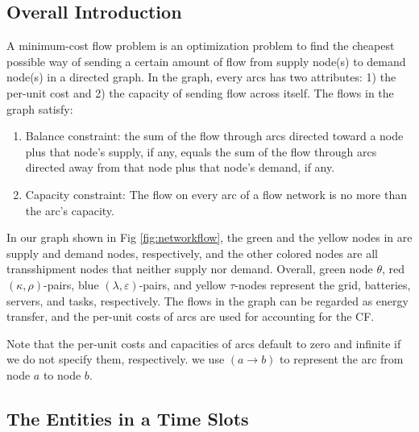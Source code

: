 \documentclass[conference, 10pt, ﬁnal, letterpaper, twocolumn]{IEEEtran}
\begin{document}
\subsection{Overall Introduction}
A minimum-cost flow problem is an optimization problem to find the cheapest possible way of sending a certain amount of flow from supply node(s) to demand node(s) in a directed graph. In the graph, every arcs has two attributes: 1) the per-unit cost and 2) the capacity of sending flow across itself. The flows in the graph satisfy:
\begin{enumerate}
    \item Balance constraint: the sum of the flow through arcs directed toward a node plus that node's supply, if any, equals the sum of the flow through arcs directed away from that node plus that node's demand, if any. 
    \item Capacity constraint: The flow on every arc of a flow network is no more than the arc's capacity.
\end{enumerate}

In our graph shown in Fig \ref{fig:networkflow}, the green and the yellow nodes in are supply and demand nodes, respectively, and the other colored nodes are all transshipment nodes that neither supply nor demand. Overall, green node $\theta$, red $(\kappa, \rho)$-pairs, blue $(\lambda, \varepsilon)$-pairs, and yellow $\tau$-nodes represent the grid, batteries, servers, and tasks, respectively. The flows in the graph can be regarded as energy transfer, and the per-unit costs of arcs are used for accounting for the CF.

Note that the per-unit costs and capacities of arcs default to zero and infinite if we do not specify them, respectively. we use $(a\rightarrow b)$ to represent the arc from node $a$ to node $b$.

\subsection{The Entities in a Time Slots} \label{sub-A}
\end{document}
